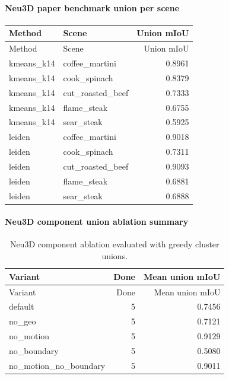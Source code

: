 \documentclass[10pt]{article}
\begin{document}
\paragraph{Neu3D paper benchmark union per scene}
\small
\begin{longtable}{llr}
\toprule
Method & Scene & Union mIoU \\
\midrule
\endfirsthead
\toprule
Method & Scene & Union mIoU \\
\midrule
\endhead
kmeans\_k14 & coffee\_martini & 0.8961 \\
kmeans\_k14 & cook\_spinach & 0.8379 \\
kmeans\_k14 & cut\_roasted\_beef & 0.7333 \\
kmeans\_k14 & flame\_steak & 0.6755 \\
kmeans\_k14 & sear\_steak & 0.5925 \\
leiden & coffee\_martini & 0.9018 \\
leiden & cook\_spinach & 0.7311 \\
leiden & cut\_roasted\_beef & 0.9093 \\
leiden & flame\_steak & 0.6881 \\
leiden & sear\_steak & 0.6888 \\
\bottomrule
\end{longtable}
\normalsize

\paragraph{Neu3D component union ablation summary}
\small
\begin{longtable}{lrr}
\caption{Neu3D component ablation evaluated with greedy cluster unions.}\\
\toprule
Variant & Done & Mean union mIoU \\
\midrule
\endfirsthead
\toprule
Variant & Done & Mean union mIoU \\
\midrule
\endhead
default & 5 & 0.7456 \\
no\_geo & 5 & 0.7121 \\
no\_motion & 5 & 0.9129 \\
no\_boundary & 5 & 0.5080 \\
no\_motion\_no\_boundary & 5 & 0.9011 \\
\bottomrule
\end{longtable}
\normalsize
\end{document}
